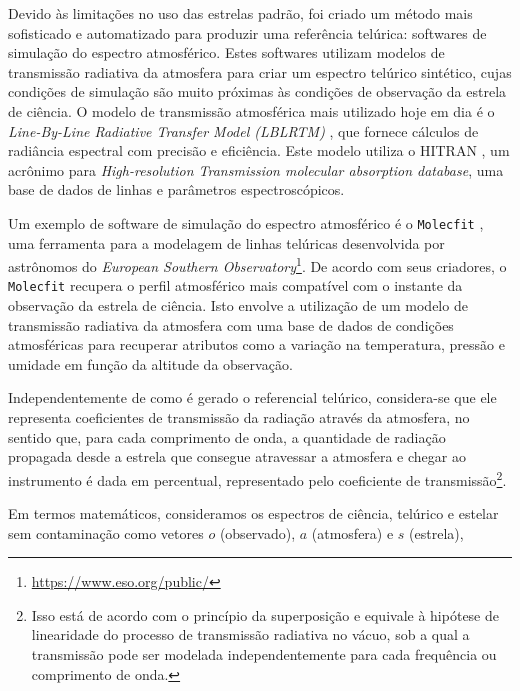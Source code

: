 Devido às limitações no uso das estrelas padrão, foi criado um método mais sofisticado e automatizado para produzir uma referência telúrica: softwares de simulação do espectro atmosférico. Estes softwares utilizam modelos de transmissão radiativa da atmosfera para criar um espectro telúrico sintético, cujas condições de simulação são muito próximas às condições de observação da estrela de ciência. O modelo de transmissão atmosférica mais utilizado hoje em dia é o \textit{Line-By-Line Radiative Transfer Model (LBLRTM)} \citep{2005JQSRT..91..233C}, que fornece cálculos de radiância espectral com precisão e eficiência. Este modelo utiliza o HITRAN \citep{rothman2009hitran}, um acrônimo para \textit{High-resolution Transmission molecular absorption database}, uma base de dados de linhas e parâmetros espectroscópicos. 

Um exemplo de software de simulação do espectro atmosférico é o \texttt{Molecfit} \citep{smette2015molecfit}, uma ferramenta para a modelagem de linhas telúricas desenvolvida por astrônomos do \textit{European Southern Observatory}\footnote{\url{https://www.eso.org/public/}}. De acordo com seus criadores, o \texttt{Molecfit} recupera o perfil atmosférico mais compatível com o instante da observação da estrela de ciência. Isto envolve a utilização de um modelo de transmissão radiativa da atmosfera com uma base de dados de condições atmosféricas para recuperar atributos como a variação na temperatura, pressão e umidade em função da altitude da observação.

Independentemente de como é gerado o referencial telúrico, considera-se que ele representa coeficientes de transmissão da radiação através da atmosfera, no sentido que, para cada comprimento de onda, a quantidade de radiação propagada desde a estrela que consegue atravessar a atmosfera e chegar ao instrumento é dada em percentual, representado pelo coeficiente de transmissão\footnote{Isso está de acordo com o princípio da superposição e equivale à hipótese de linearidade do processo de transmissão radiativa no vácuo, sob a qual a transmissão pode ser modelada independentemente para cada frequência ou comprimento de onda.}. %

Em termos matemáticos, consideramos os espectros de ciência, telúrico e estelar sem contaminação como vetores $o$ (observado), $a$ (atmosfera) e $s$ (estrela),

